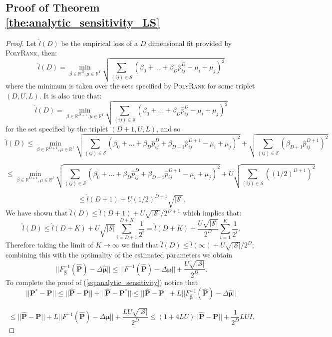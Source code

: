 \documentclass[twoside,11pt]{article}
\begin{document}
\subsection{Proof of Theorem \ref{the:analytic_sensitivity_LS}}
\begin{proof} Let $\hat{l}(D)$ be the empirical loss of a $D$ dimensional fit provided by \textsc{PolyRank}, then:
$$\hat{l}(D) = \min_{ \beta\in \mathbb{R}^D,    \mu\in\mathbb{R}^{I} } \sqrt{\sum_{(ij)\in \mathcal{S}}(\beta_0+...+\beta_D\hat{p}_{ij}^D - \mu_i +\mu_j)^2 }$$
where  the minimum is taken over the sets specified by  \textsc{PolyRank} for some triplet $(D,U,L)$. It is also true that: 
$$\hat{l}(D) = \min_{ \beta\in \mathbb{R}^{D+1},    \mu\in\mathbb{R}^{I} } \sqrt{\sum_{(ij)\in \mathcal{S}}(\beta_0+...+\beta_D\hat{p}_{ij}^D - \mu_i +\mu_j)^2 }$$
for the set specified by the triplet $(D+1,U,L)$, and so
$$\hat{l}(D) \leq  \min_{\beta\in \mathbb{R}^{D+1}, \mu\in \mathbb{R}^I} \sqrt{\sum_{(ij)\in \mathcal{S}}(\beta_0+...+\beta_D\hat{p}_{ij}^D +\beta_{D+1}\hat{p}_{ij}^{D+1} - \mu_i +\mu_j)^2 }  + \sqrt{\sum_{(ij)\in \mathcal{S}}(\beta_{D+1}\hat{p}_{ij}^{D+1})^2 } $$

$$\leq  \min_{\beta\in \mathbb{R}^{D+1}, \mu\in \mathbb{R}^I} \sqrt{\sum_{(ij)\in \mathcal{S}}(\beta_0+...+\beta_D\hat{p}_{ij}^D +\beta_{D+1}\hat{p}_{ij}^{D+1} - \mu_i +\mu_j)^2 }  + U\sqrt{\sum_{(ij)\in \mathcal{S}}(\left(1/2\right)^{D+1})^2 } $$

$$\leq  \hat{l}(D+1) + U\left(1/2\right)^{D+1}\sqrt{|\mathcal{S}| }  .$$
We have shown that $\hat{l}(D)\leq \hat{l}(D+1) + U\sqrt{|\mathcal{S}| }/2^{D+1}$ which implies that:
$$\hat{l}(D)\leq \hat{l}(D+K) + U\sqrt{|\mathcal{S}| } \sum_{i = D+1}^{D+K}\frac{1}{2^i} =\hat{l}(D+K) + \frac{U\sqrt{|\mathcal{S}| }}{2^{D}} \sum_{i = 1}^{K}\frac{1}{2^i}. $$
Therefore taking the limit of $K \to \infty$ we find that $\hat{l}(D)\leq \hat{l}(\infty) + U\sqrt{|\mathcal{S}| }/2^{D}$;
combining this with the  optimality of the estimated parameters we obtain
\begin{equation}
\label{eq:loss_infinity}
||F^{-1}_{\boldsymbol{\hat \beta}}(\boldsymbol{\hat P}) - \Delta \boldsymbol{\hat \mu}||\leq||F^{-1}(\boldsymbol{\hat P}) - \Delta \boldsymbol{\mu}|| + \frac{U\sqrt{|\mathcal{S}| }}{2^{D}}.
\end{equation}
To complete the proof of (\ref{eq:analytic_sensitivity}) notice that $$||\boldsymbol{P}^* - \boldsymbol{P}||\leq ||\boldsymbol{\hat P} - \boldsymbol{P}|| + ||\boldsymbol{\hat P} - \boldsymbol{P}^*|| \leq ||\boldsymbol{\hat P} - \boldsymbol{P}|| + L||F^{-1}_{\boldsymbol{\hat \beta}}(\boldsymbol{\hat P}) - \Delta \boldsymbol{\hat \mu}||$$

$$\leq  ||\boldsymbol{\hat P} - \boldsymbol{P}|| + L||F^{-1}(\boldsymbol{\hat P}) - \Delta \boldsymbol{\mu}|| + \frac{LU\sqrt{|\mathcal{S}| }}{2^{D}} \leq(1+4LU) ||\boldsymbol{\hat P} - \boldsymbol{P}|| + \frac{1}{2^D}LUI. $$ 
\end{proof}
\end{document}
